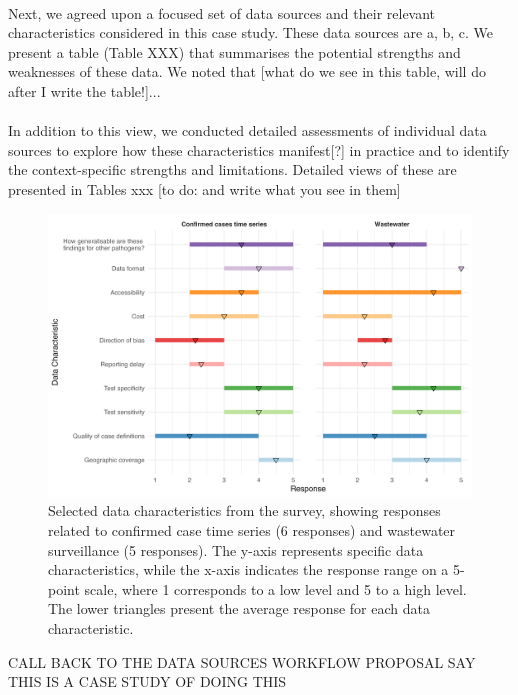 \documentclass{article}
\begin{document}
\paragraph{}Next, we agreed upon a focused set of data sources and their relevant characteristics considered in this case study. These data sources are a, b, c. We present a table (Table XXX) that summarises the potential strengths and weaknesses of these data. We noted that [what do we see in this table, will do after I write the table!]... 

\paragraph{}In addition to this view, we conducted detailed assessments of individual data sources to explore how these characteristics manifest[?] in practice and to identify the context-specific strengths and limitations. Detailed views of these are presented in Tables xxx [to do: and write what you see in them]

\begin{figure}[H] 
\includegraphics[width=1\linewidth]{figures/survey_responses.png}
\centering
\caption{ Selected data characteristics from the survey, showing responses related to confirmed case time series (6 responses) and wastewater surveillance (5 responses). The y-axis represents specific data characteristics, while the x-axis indicates the response range on a 5-point scale, where 1 corresponds to a low level and 5 to a high level. The lower triangles present the average response for each data characteristic.}
\label{survey_responses}
\end{figure}

CALL BACK TO THE DATA SOURCES WORKFLOW PROPOSAL
SAY THIS IS A CASE STUDY OF DOING THIS
\end{document}
